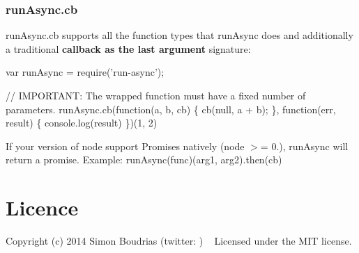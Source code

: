 \subsubsection*{run\+Async.\+cb}

{\ttfamily run\+Async.\+cb} supports all the function types that {\ttfamily run\+Async} does and additionally a traditional {\bfseries callback as the last argument} signature\+:


\begin{DoxyCode}
var runAsync = require('run-async');

// IMPORTANT: The wrapped function must have a fixed number of parameters.
runAsync.cb(function(a, b, cb) \{
  cb(null, a + b);
\}, function(err, result) \{
  console.log(result)
\})(1, 2)
\end{DoxyCode}


If your version of node support Promises natively (node $>$= 0.), {\ttfamily run\+Async} will return a promise. Example\+: {\ttfamily run\+Async(func)(arg1, arg2).then(cb)}

\section*{Licence }

Copyright (c) 2014 Simon Boudrias (twitter\+: ) ~\newline
Licensed under the M\+IT license. 